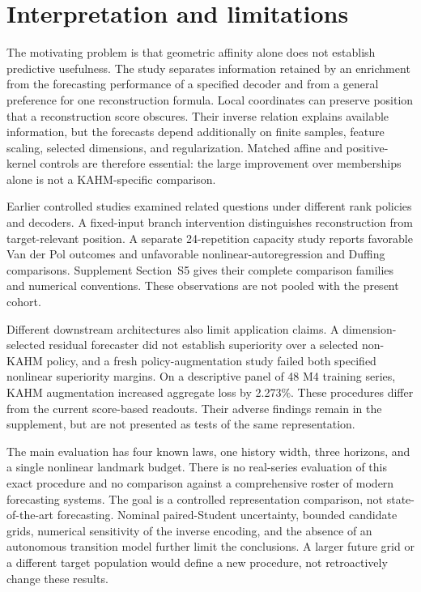 \section{Interpretation and limitations}\label{sec:discussion}
The motivating problem is that geometric affinity alone does not establish predictive usefulness. The study separates information retained by an enrichment from the forecasting performance of a specified decoder and from a general preference for one reconstruction formula. Local coordinates can preserve position that a reconstruction score obscures. Their inverse relation explains available information, but the forecasts depend additionally on finite samples, feature scaling, selected dimensions, and regularization. Matched affine and positive-kernel controls are therefore essential: the large improvement over memberships alone is not a KAHM-specific comparison.

Earlier controlled studies examined related questions under different rank policies and decoders. A fixed-input branch intervention distinguishes reconstruction from target-relevant position. A separate 24-repetition capacity study reports favorable Van der Pol outcomes and unfavorable nonlinear-autoregression and Duffing comparisons. Supplement Section~S5 gives their complete comparison families and numerical conventions. These observations are not pooled with the present cohort.

Different downstream architectures also limit application claims. A dimension-selected residual forecaster did not establish superiority over a selected non-KAHM policy, and a fresh policy-augmentation study failed both specified nonlinear superiority margins. On a descriptive panel of 48 M4 training series, KAHM augmentation increased aggregate loss by 2.273\%. These procedures differ from the current score-based readouts. Their adverse findings remain in the supplement, but are not presented as tests of the same representation.

The main evaluation has four known laws, one history width, three horizons, and a single nonlinear landmark budget. There is no real-series evaluation of this exact procedure and no comparison against a comprehensive roster of modern forecasting systems. The goal is a controlled representation comparison, not state-of-the-art forecasting. Nominal paired-Student uncertainty, bounded candidate grids, numerical sensitivity of the inverse encoding, and the absence of an autonomous transition model further limit the conclusions. A larger future grid or a different target population would define a new procedure, not retroactively change these results.

